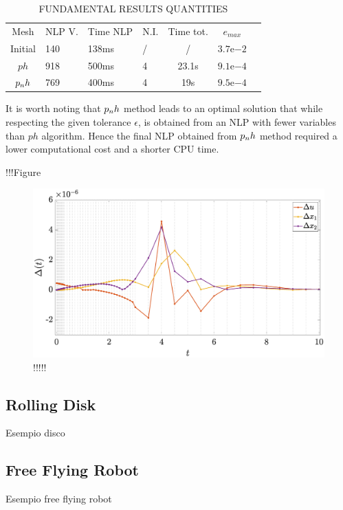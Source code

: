 \begin{table}[h]
	\caption{FUNDAMENTAL RESULTS QUANTITIES}
	\begin{center}
		\label{tab:tablevanderpol}
		\begin{tabular}{c l l l c c c}
			& & \\ %
			\hline
			Mesh & NLP V. & Time NLP & N.I. & Time tot. & $e_{max}$ \\
			\hline
			Initial & 140 & 138ms & / & / &  $3.7\mathrm{e}{-2}$\\
			$ph$ & 918 & 500ms & 4 & 23.1s & $9.1\mathrm{e}{-4}$ \\
			$p_{n}h$ & 769 & 400ms & 4 & 19s & $9.5\mathrm{e}{-4}$ \\
			\hline
		\end{tabular}
	\end{center}
\end{table}

It is worth noting that $p_{n}h$ method leads to an optimal solution that while respecting the given tolerance $\epsilon$, is obtained from an NLP with fewer variables than $ph$ algorithm.
Hence the final NLP obtained from $p_{n}h$ method required a lower computational cost and a shorter CPU time. 

!!!Figure %

\begin{figure}
	\centering
	\includegraphics[trim={2cm 0cm 4cm 0cm},clip,width=1.\linewidth]{Img/delta_vanderpol}
	\caption{!!!!!}
	\label{fig:deltavanderpol}
\end{figure}



\subsection*{Rolling Disk}
Esempio disco

\subsection*{Free Flying Robot}
Esempio free flying robot

